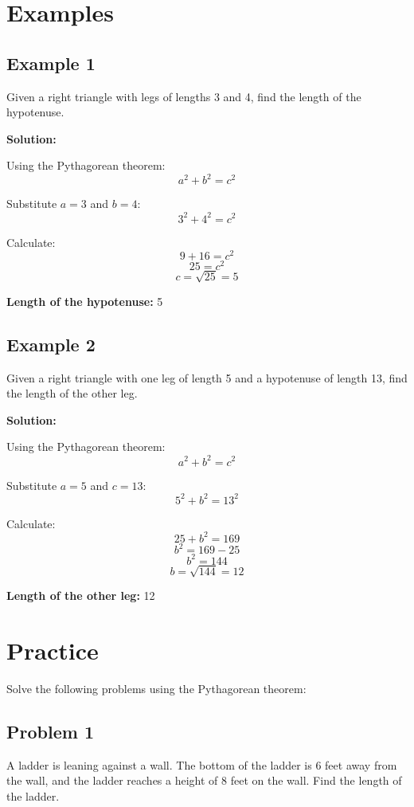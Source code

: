\documentclass[12pt]{article}
\begin{document}
\newpage

\section*{Examples}

\subsection*{Example 1}

Given a right triangle with legs of lengths 3 and 4, find the length of the hypotenuse.

\textbf{Solution:}

Using the Pythagorean theorem:
\[
a^2 + b^2 = c^2
\]

Substitute \(a = 3\) and \(b = 4\):
\[
3^2 + 4^2 = c^2
\]

Calculate:
\[
9 + 16 = c^2
\]
\[
25 = c^2
\]
\[
c = \sqrt{25} = 5
\]

\textbf{Length of the hypotenuse:} 5

\subsection*{Example 2}

Given a right triangle with one leg of length 5 and a hypotenuse of length 13, find the length of the other leg.

\textbf{Solution:}

Using the Pythagorean theorem:
\[
a^2 + b^2 = c^2
\]

Substitute \(a = 5\) and \(c = 13\):
\[
5^2 + b^2 = 13^2
\]

Calculate:
\[
25 + b^2 = 169
\]
\[
b^2 = 169 - 25
\]
\[
b^2 = 144
\]
\[
b = \sqrt{144} = 12
\]

\textbf{Length of the other leg:} 12

\section*{Practice}

Solve the following problems using the Pythagorean theorem:

\subsection*{Problem 1}

A ladder is leaning against a wall. The bottom of the ladder is 6 feet away from the wall, and the ladder reaches a height of 8 feet on the wall. Find the length of the ladder.
\end{document}

